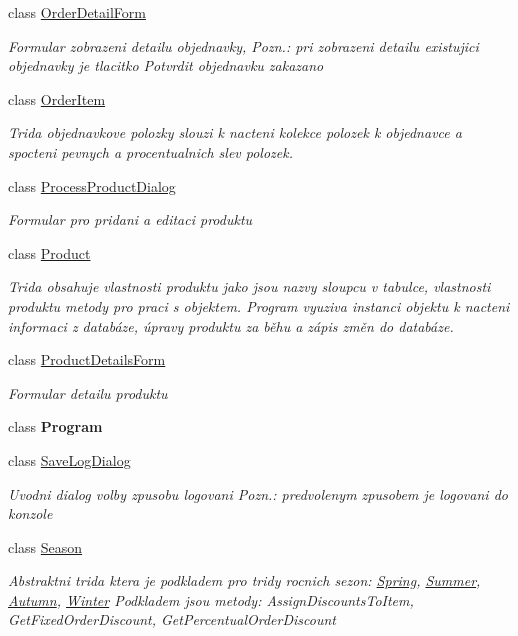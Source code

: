 \begin{DoxyCompactItemize}
class \mbox{\hyperlink{class_eshop_1_1_order_detail_form}{Order\+Detail\+Form}}
\begin{DoxyCompactList}\small\item\em Formular zobrazeni detailu objednavky, Pozn.\+: pri zobrazeni detailu existujici objednavky je tlacitko Potvrdit objednavku zakazano \end{DoxyCompactList}\item 
class \mbox{\hyperlink{class_eshop_1_1_order_item}{Order\+Item}}
\begin{DoxyCompactList}\small\item\em Trida objednavkove polozky slouzi k nacteni kolekce polozek k objednavce a spocteni pevnych a procentualnich slev polozek. \end{DoxyCompactList}\item 
class \mbox{\hyperlink{class_eshop_1_1_process_product_dialog}{Process\+Product\+Dialog}}
\begin{DoxyCompactList}\small\item\em Formular pro pridani a editaci produktu \end{DoxyCompactList}\item 
class \mbox{\hyperlink{class_eshop_1_1_product}{Product}}
\begin{DoxyCompactList}\small\item\em Trida obsahuje vlastnosti produktu jako jsou nazvy sloupcu v tabulce, vlastnosti produktu metody pro praci s objektem. Program vyuziva instanci objektu k nacteni informaci z databáze, úpravy produktu za běhu a zápis změn do databáze. \end{DoxyCompactList}\item 
class \mbox{\hyperlink{class_eshop_1_1_product_details_form}{Product\+Details\+Form}}
\begin{DoxyCompactList}\small\item\em Formular detailu produktu \end{DoxyCompactList}\item 
class {\bfseries Program}
\item 
class \mbox{\hyperlink{class_eshop_1_1_save_log_dialog}{Save\+Log\+Dialog}}
\begin{DoxyCompactList}\small\item\em Uvodni dialog volby zpusobu logovani Pozn.\+: predvolenym zpusobem je logovani do konzole \end{DoxyCompactList}\item 
class \mbox{\hyperlink{class_eshop_1_1_season}{Season}}
\begin{DoxyCompactList}\small\item\em Abstraktni trida ktera je podkladem pro tridy rocnich sezon\+: \mbox{\hyperlink{class_eshop_1_1_spring}{Spring}}, \mbox{\hyperlink{class_eshop_1_1_summer}{Summer}}, \mbox{\hyperlink{class_eshop_1_1_autumn}{Autumn}}, \mbox{\hyperlink{class_eshop_1_1_winter}{Winter}} Podkladem jsou metody\+: Assign\+Discounts\+To\+Item, Get\+Fixed\+Order\+Discount, Get\+Percentual\+Order\+Discount \end{DoxyCompactList}\item 

\end{DoxyCompactItemize}
